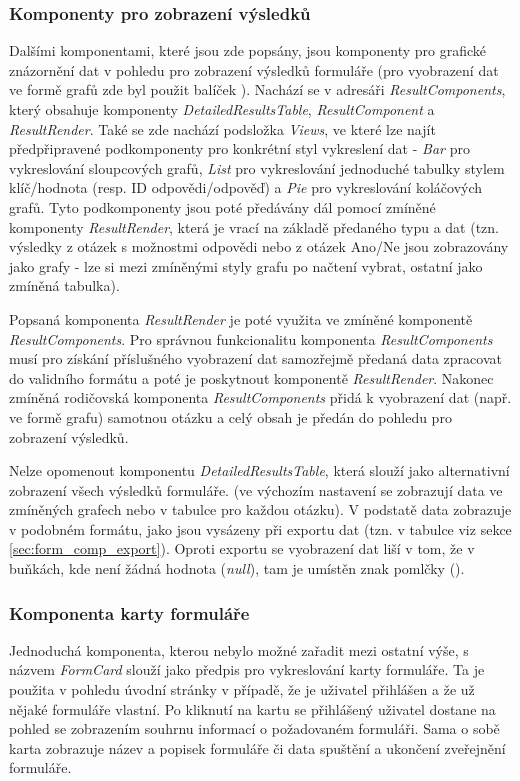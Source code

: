 		\subsubsection{Komponenty pro zobrazení výsledků} \label{sec:komp_vysledky} %
		Dalšími komponentami, které jsou zde popsány, jsou komponenty pro grafické znázornění dat v pohledu pro zobrazení výsledků formuláře (pro vyobrazení dat ve formě grafů zde byl použit balíček ). Nachází se v adresáři \textit{ResultComponents}, který obsahuje komponenty \textit{DetailedResultsTable}, \textit{ResultComponent} a \textit{ResultRender}. Také se zde nachází podsložka \textit{Views}, ve které lze najít předpřipravené podkomponenty pro konkrétní styl vykreslení dat - \textit{Bar} pro vykreslování sloupcových grafů, \textit{List} pro vykreslování jednoduché tabulky stylem klíč/hodnota (resp. ID odpovědi/odpověď) a \textit{Pie} pro vykreslování koláčových grafů. Tyto podkomponenty jsou poté předávány dál pomocí zmíněné komponenty \textit{ResultRender}, která je vrací na základě předaného typu a dat (tzn. výsledky z otázek s možnostmi odpovědi nebo z otázek Ano/Ne jsou zobrazovány jako grafy - lze si mezi zmíněnými styly grafu po načtení vybrat, ostatní jako zmíněná tabulka).
		
		Popsaná komponenta \textit{ResultRender} je poté využita ve zmíněné komponentě \textit{ResultComponents}. Pro správnou funkcionalitu komponenta \textit{ResultComponents} musí pro získání příslušného vyobrazení dat samozřejmě předaná data zpracovat do validního formátu a poté je poskytnout komponentě \textit{ResultRender}. Nakonec zmíněná rodičovská komponenta \textit{ResultComponents} přidá k vyobrazení dat (např. ve formě grafu) samotnou otázku a celý obsah je předán do pohledu pro zobrazení výsledků.
		
		Nelze opomenout komponentu \textit{DetailedResultsTable}, která slouží jako alternativní zobrazení všech výsledků formuláře. (ve výchozím nastavení se zobrazují data ve zmíněných grafech nebo v tabulce pro každou otázku). V podstatě data zobrazuje v podobném formátu, jako jsou vysázeny při exportu dat (tzn. v tabulce viz sekce \ref{sec:form_comp_export}). Oproti exportu se vyobrazení dat liší v tom, že v buňkách, kde není žádná hodnota (\textit{null}), tam je umístěn znak pomlčky (\uv{-}).
		
		\subsubsection{Komponenta karty formuláře}\label{sec:fe_komp_karta_form}
		Jednoduchá komponenta, kterou nebylo možné zařadit mezi ostatní výše, s názvem \textit{FormCard} slouží jako předpis pro vykreslování karty formuláře. Ta je použita v pohledu úvodní stránky v případě, že je uživatel přihlášen a že už nějaké formuláře vlastní. Po kliknutí na kartu se přihlášený uživatel dostane na pohled se zobrazením souhrnu informací o požadovaném formuláři. Sama o sobě karta zobrazuje název a popisek formuláře či data spuštění a ukončení zveřejnění formuláře.
	
